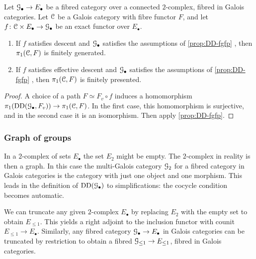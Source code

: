 \begin{cor}
\label{cor:DD-fgfp}
       Let ${\mathcal G}_\bullet \to E_\bullet$ be a fibred category over a connected $2$-complex, fibred in Galois categories. Let ${\mathcal C}$ be a Galois category with fibre functor $F$, and let $f\colon  {\mathcal C} \times E_\bullet \to {\mathcal G}_\bullet$  be an exact functor over $E_\bullet$.  
       \begin{enumerate}[ref=(\arabic*)]
           \item 
            \label{coritem:DD-fg}
           If $f$ satisfies descent and ${\mathcal G}_\bullet$ satisfies the assumptions of \cref{prop:DD-fgfp} , then $\pi_1({\mathcal C},F)$ is finitely generated.
           \item 
            \label{coritem:DD-fp}
           If $f$ satisfies effective descent and ${\mathcal G}_\bullet$ satisfies the assumptions of \cref{prop:DD-fgfp} , then $\pi_1({\mathcal C},F)$ is finitely presented.
       \end{enumerate}
\end{cor}
\begin{proof}
    A choice of a path $F \simeq F_v \circ f$ induces a homomorphism $\pi_1(\operatorname{DD}({\mathcal G}_\bullet,F_v)) \to \pi_1({\mathcal C},F)$. In the first case, this homomorphism is surjective, and in the second case it is an isomorphism. Then apply \cref{prop:DD-fgfp}.
\end{proof}


\subsubsection*{Graph of groups} 

In a $2$-complex of sets $E_\bullet$ the set $E_2$ might be empty. The $2$-complex in reality is then a graph. In this case the multi-Galois category ${\mathcal G}_2$ for a fibred category in Galois categories is the category with just one object and one morphism. This leads in the definition of $\operatorname{DD}({\mathcal G}_\bullet)$ to simplifications: the cocycle condition becomes automatic. 

We can truncate any given $2$-complex $E_\bullet$ by replacing $E_2$ with the empty set to obtain $E_{\le 1}$. This yields a right adjoint to the inclusion functor with counit $E_{\leq 1} \to E_\bullet$. Similarly, any fibred category ${\mathcal G}_\bullet \to E_\bullet$ in Galois categories can be truncated by restriction to obtain a fibred ${\mathcal G}_{\leq 1} \to E_{\leq 1}$, fibred in Galois categories. 


